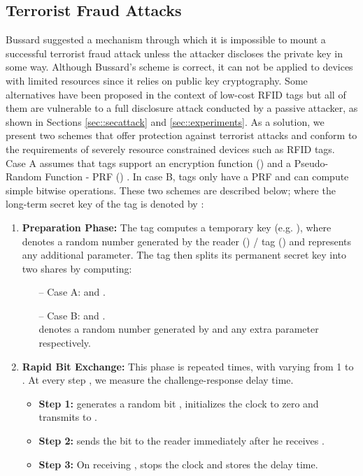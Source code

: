 \documentclass{article}
\begin{document}
\subsection{Terrorist Fraud Attacks}
Bussard \cite{Bussard-2004-thesis,BussardB05} suggested a mechanism through which it is impossible to mount a successful terrorist fraud attack unless the attacker discloses the private key in some way.  Although Bussard's scheme is correct, it can not be applied to devices with limited resources since it relies on public key cryptography.  Some alternatives have been proposed in the context of low-cost RFID tags but all of them are vulnerable to a full disclosure attack conducted by a passive attacker, as shown in Sections \ref{sec::secattack} and \ref{sec::experiments}. As a solution, we present two schemes that offer protection against terrorist attacks and conform to the requirements of severely resource constrained devices such as RFID tags.  Case A assumes that tags support an encryption function () \cite{BogdanovKLPPRSV-2007-ches,HellJM-2006} and a Pseudo-Random Function - PRF () \cite{lee-prf-2007}. In case B, tags only have a PRF  and can compute simple bitwise operations. These two schemes are described below; where the long-term secret key of the tag is denoted by  :
     \begin{enumerate}
      \item \textbf{Preparation Phase:}  The tag computes a temporary key (e.g. ), where  denotes a random number generated by the reader () / tag () and  represents any additional parameter.  The tag then splits its permanent secret key  into two shares by computing:
          \begin{itemize}
            \item[--]Case A:  and .
            \item[--]Case B:  and . \\
              denotes a random number generated by  and  any extra parameter respectively.
          \end{itemize}
      \item \textbf{Rapid Bit Exchange:} This phase is repeated  times, with  varying from 1 to .  At every step , we measure the challenge-response delay time.
    \begin{itemize}
             \item \textbf{Step 1:}   generates a random bit , initializes the clock to zero and transmits  to .
             \item \textbf{Step 2:}  sends the bit  to the reader  immediately after he receives .
             \item \textbf{Step 3:} On receiving ,  stops the clock and stores the delay time.
    \end{itemize}
    \end{enumerate}
\end{document}

